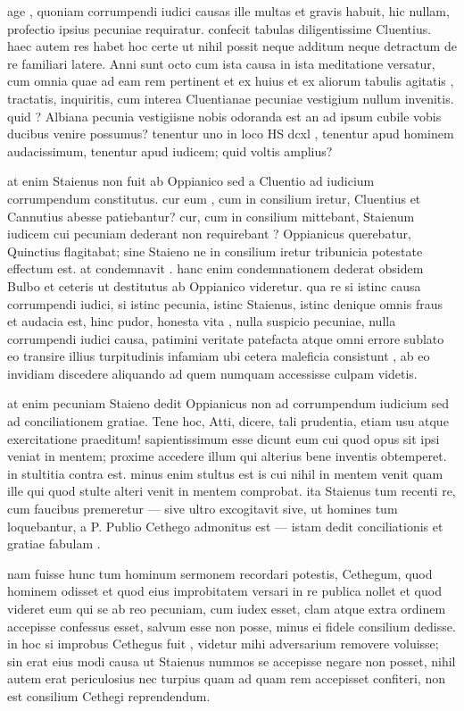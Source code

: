  age , quoniam corrumpendi iudici causas ille multas et gravis habuit, hic nullam, profectio ipsius pecuniae requiratur. confecit tabulas diligentissime Cluentius. haec autem res habet hoc certe ut nihil possit neque additum neque detractum de re familiari latere. Anni sunt octo cum ista causa in ista meditatione versatur, cum omnia quae ad eam rem pertinent et ex huius et ex aliorum tabulis agitatis , tractatis, inquiritis, cum interea Cluentianae pecuniae vestigium nullum invenitis. quid ? Albiana pecunia vestigiisne nobis odoranda est an ad ipsum cubile vobis ducibus venire possumus? tenentur uno in loco HS dcxl , tenentur apud hominem audacissimum, tenentur apud iudicem; quid voltis amplius?

 at enim Staienus non fuit ab Oppianico sed a Cluentio ad iudicium corrumpendum constitutus. cur eum , cum in consilium iretur, Cluentius et Cannutius abesse patiebantur? cur, cum in consilium mittebant, Staienum iudicem cui pecuniam dederant non requirebant ? Oppianicus querebatur, Quinctius flagitabat; sine Staieno ne in consilium iretur tribunicia potestate effectum est. at condemnavit . hanc enim condemnationem dederat obsidem Bulbo et ceteris ut destitutus ab Oppianico videretur. qua re si istinc causa corrumpendi iudici, si istinc pecunia, istinc Staienus, istinc denique omnis fraus et audacia est, hinc pudor, honesta vita , nulla suspicio pecuniae, nulla corrumpendi iudici causa, patimini veritate patefacta atque omni errore sublato eo transire illius turpitudinis infamiam ubi cetera maleficia consistunt , ab eo invidiam discedere aliquando ad quem numquam accessisse culpam videtis.

 at enim pecuniam Staieno dedit Oppianicus non ad corrumpendum iudicium sed ad conciliationem gratiae. Tene hoc, Atti, dicere, tali prudentia, etiam usu atque exercitatione praeditum! sapientissimum esse dicunt eum cui quod opus sit ipsi veniat in mentem; proxime accedere illum qui alterius bene inventis obtemperet. in stultitia contra est. minus enim stultus est is cui nihil in mentem venit quam ille qui quod stulte alteri venit in mentem comprobat. ita Staienus tum recenti re, cum faucibus premeretur — sive ultro excogitavit sive, ut homines tum loquebantur, a P. Publio Cethego admonitus est — istam dedit conciliationis et gratiae fabulam .

 nam fuisse hunc tum hominum sermonem recordari potestis, Cethegum, quod hominem odisset et quod eius improbitatem versari in re publica nollet et quod videret eum qui se ab reo pecuniam, cum iudex esset, clam atque extra ordinem accepisse confessus esset, salvum esse non posse, minus ei fidele consilium dedisse. in hoc si improbus Cethegus fuit , videtur mihi adversarium removere voluisse; sin erat eius modi causa ut Staienus nummos se accepisse negare non posset, nihil autem erat periculosius nec turpius quam ad quam rem accepisset confiteri, non est consilium Cethegi reprendendum.

